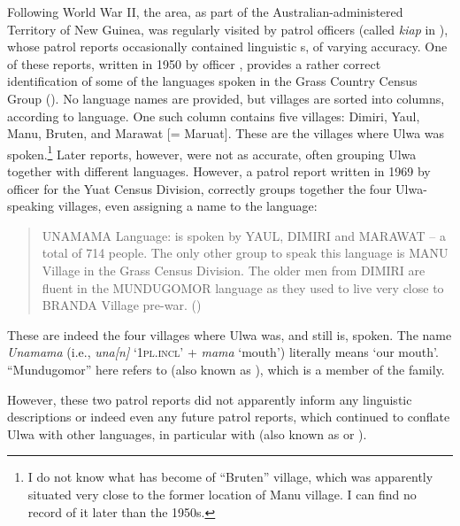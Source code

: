 Following World War II, the  area, as part of the Australian-administered Territory of New Guinea, was regularly visited by patrol officers (called \textit{kiap} in ), whose patrol reports occasionally contained linguistic s, of varying accuracy. One of these reports, written in 1950 by officer , provides a rather correct identification of some of the languages spoken in the Grass Country Census Group (\citealt[no. 19]{PatrolReports1950}). No language names are provided, but villages are sorted into columns, according to language. One such column contains five villages: Dimiri, Yaul, Manu, Bruten, and Marawat [= Maruat]. These are the villages where Ulwa was spoken.\footnote{I do not know what has become of “Bruten” village, which was apparently situated very close to the former location of Manu village. I can find no record of it later than the 1950s.} Later reports, however, were not as accurate, often grouping Ulwa together with different languages. However, a patrol report written in 1969 by officer  for the Yuat Census Division, correctly groups together the four Ulwa-speaking villages, even assigning a name to the language:

\begin{quote}
UNAMAMA Language: is spoken by YAUL, DIMIRI and MARAWAT -- a total of 714 people. The only other group to speak this language is MANU Village in the Grass Census Division. The older men from DIMIRI are fluent in the MUNDUGOMOR language as they used to live very close to BRANDA Village pre-war. (\citealt[no. 4]{PatrolReports1969})
\end{quote}

These are indeed the four villages where Ulwa was, and still is, spoken. The name \textit{Unamama} (i.e., \textit{una[n]} ‘\textsc{1pl.incl’} + \textit{mama} ‘mouth’) literally means ‘our mouth’. “Mundugomor” here refers to  (also known as ), which is a member of the  family.

However, these two patrol reports did not apparently inform any linguistic descriptions or indeed even any future patrol reports, which continued to conflate Ulwa with other languages, in particular with  (also known as  or ).

